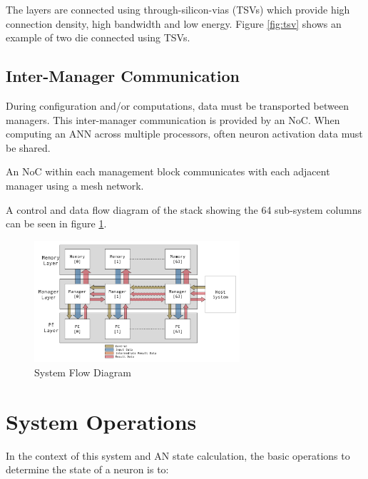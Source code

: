 \documentclass[journal]{IEEEtran}
\begin{document}
The layers are connected using through-silicon-vias (TSVs) which provide high connection density, high bandwidth and low energy.
Figure \ref{fig:tsv} shows an example of two die connected using TSVs.

\subsection{Inter-Manager Communication}
\label{ssec:Inter-Manager Communication}

During configuration and/or computations, data must be transported between managers. This inter-manager communication is provided by an NoC.
When computing an ANN across multiple processors, often neuron activation data must be shared. 

An NoC within each management block communicates with each adjacent manager using a mesh network. 

A control and data flow diagram of the stack showing the 64 sub-system columns can be seen in figure \ref{fig:FlowDiagram}.

\begin{figure}[!t]
\centering
\captionsetup{justification=centering}
\centerline{
\mbox{\includegraphics[width=3.0in]{FlowDiagram.jpg}}
}
\caption{System Flow Diagram}
\label{fig:FlowDiagram}
\end{figure}


\section{System Operations}
\label{sec:System Operations}
In the context of this system and AN state calculation, the basic operations to determine the state of a neuron is to:
\end{document}
